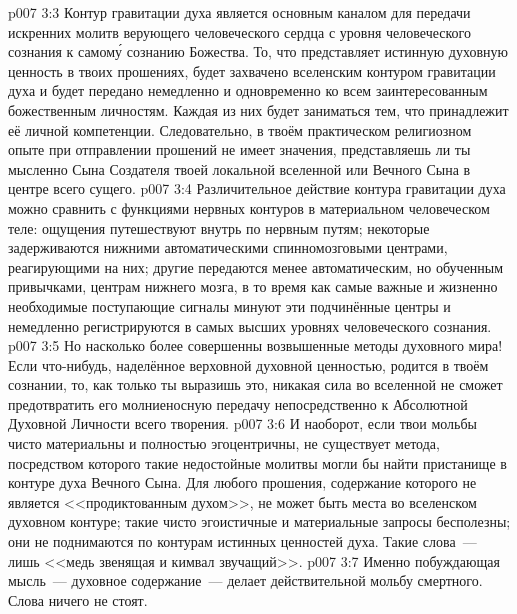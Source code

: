 \vs p007 3:3 \pc Контур гравитации духа является основным каналом для передачи искренних молитв верующего человеческого сердца с уровня человеческого сознания к самом\'у сознанию Божества. То, что представляет истинную духовную ценность в твоих прошениях, будет захвачено вселенским контуром гравитации духа и будет передано немедленно и одновременно ко всем заинтересованным божественным личностям. Каждая из них будет заниматься тем, что принадлежит её личной компетенции. Следовательно, в твоём практическом религиозном опыте при отправлении прошений не имеет значения, представляешь ли ты мысленно Сына Создателя твоей локальной вселенной или Вечного Сына в центре всего сущего.
\vs p007 3:4 \pc Различительное действие контура гравитации духа можно сравнить с функциями нервных контуров в материальном человеческом теле: ощущения путешествуют внутрь по нервным путям; некоторые задерживаются нижними автоматическими спинномозговыми центрами, реагирующими на них; другие передаются менее автоматическим, но обученным привычками, центрам нижнего мозга, в то время как самые важные и жизненно необходимые поступающие сигналы минуют эти подчинённые центры и немедленно регистрируются в самых высших уровнях человеческого сознания.
\vs p007 3:5 Но насколько более совершенны возвышенные методы духовного мира! Если что\hyp{}нибудь, наделённое верховной духовной ценностью, родится в твоём сознании, то, как только ты выразишь это, никакая сила во вселенной не сможет предотвратить его молниеносную передачу непосредственно к Абсолютной Духовной Личности всего творения.
\vs p007 3:6 И наоборот, если твои мольбы чисто материальны и полностью эгоцентричны, не существует метода, посредством которого такие недостойные молитвы могли бы найти пристанище в контуре духа Вечного Сына. Для любого прошения, содержание которого не является <<продиктованным духом>>, не может быть места во вселенском духовном контуре; такие чисто эгоистичные и материальные запросы бесполезны; они не поднимаются по контурам истинных ценностей духа. Такие слова~--- лишь <<медь звенящая и кимвал звучащий>>.
\vs p007 3:7 Именно побуждающая мысль~--- духовное содержание~--- делает действительной мольбу смертного. Слова ничего не стоят.
